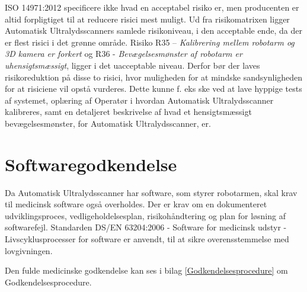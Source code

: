 ISO 14971:2012 specificere ikke hvad en acceptabel risiko er, men producenten er altid forpligtiget til at reducere risici mest muligt. Ud fra risikomatrixen ligger Automatisk Ultralydsscanners samlede risikoniveau, i den acceptable ende, da der er flest risici i det grønne område. Risiko R35 – \textit{Kalibrering mellem robotarm og 3D kamera er forkert} og R36 - \textit{Bevægelsesmønster af robotarm er uhensigtsmæssigt}, ligger i det uacceptable niveau. Derfor bør der laves risikoreduktion på disse to risici, hvor muligheden for at mindske sandsynligheden for at risiciene vil opstå vurderes. Dette kunne f. eks ske ved at lave hyppige tests af systemet, oplæring af Operatør i hvordan Automatisk Ultralydsscanner kalibreres, samt en detaljeret beskrivelse af hvad et hensigtsmæssigt bevægelsesmønster, for Automatisk Ultralydsscanner, er. 

\section{Softwaregodkendelse}
Da Automatisk Ultralydsscanner har software, som styrer robotarmen, skal krav til medicinsk software også overholdes. Der er krav om en dokumenteret udviklingsproces, vedligeholdelsesplan, risikohåndtering og plan for løsning af softwarefejl. Standarden DS/EN 63204:2006 - Software for medicinsk udstyr - Livscyklusprocesser for software \cite{software} er anvendt, til at sikre overensstemmelse med lovgivningen.

Den fulde medicinske godkendelse kan ses i bilag \ref {Godkendelsesprocedure} om Godkendelsesprocedure.
